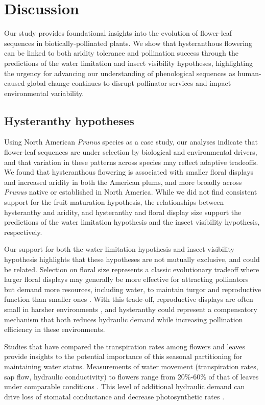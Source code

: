 \documentclass{article}[12pt]
\begin{document}
{\section*{Discussion}
Our study provides foundational insights into the evolution of flower-leaf sequences in biotically-pollinated plants. We show that hysteranthous flowering can be linked to both aridity tolerance and pollination success through the predictions of the water limitation and insect visibility hypotheses, highlighting the urgency for advancing our understanding of phenological sequences as human-caused global change continues to disrupt pollinator services and impact environmental variability. 

\subsection*{Hysteranthy hypotheses} %
Using North American \textit{Prunus} species as a case study, our analyses indicate that flower-leaf sequences are under selection by biological and environmental drivers, and that variation in these patterns across species may reflect adaptive tradeoffs. We found that hysteranthous flowering is associated with smaller floral displays and increased aridity in both the American plums, and more broadly across \emph{Prunus} native or established in North America. While we did not find consistent support for the fruit maturation hypothesis, the relationships between hysteranthy and aridity, and hysteranthy and floral display size support the predictions of the water limitation hypothesis and the insect visibility hypothesis, respectively. 

Our support for both the water limitation hypothesis and insect visibility hypothesis highlights that these hypotheses are not mutually exclusive, and could be related. Selection on floral size represents a classic evolutionary tradeoff where larger floral displays may generally be more effective for attracting pollinators but demand more resources, including water, to maintain turgor and reproductive function than smaller ones \citep{Galen:1999vr,Lambrecht:2007ur}. With this trade-off, reproductive displays are often small in harsher environments \citep{Teixido:2016aa,Lambrecht:2013aa}, and hysteranthy could represent a compensatory mechanism that both reduces hydraulic demand while increasing pollination efficiency in these environments.

Studies that have compared the transpiration rates among flowers and leaves provide insights to the potential importance of this seasonal partitioning for maintaining water status. Measurements of water movement (transpiration rates, sap flow, hydraulic conductivity) to flowers range from 20\%-60\% of that of leaves under comparable conditions \citep{Whiley:1988uf,Roddy:2012wn,Liu:2017wg,McMann:2022ww}. This level of additional hydraulic demand can drive loss of stomatal conductance and decrease photosynthetic rates \citep{Galen:1999vr}.
 
}
\end{document}
